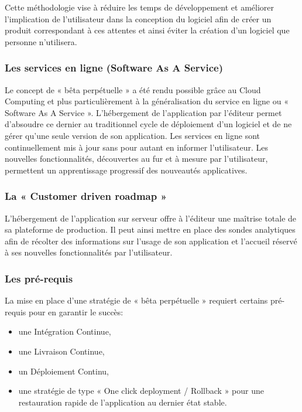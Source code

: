       Cette méthodologie vise à réduire les temps de développement et améliorer l’implication de l’utilisateur dans la conception du logiciel afin de créer un produit correspondant à ces attentes et ainsi éviter la création d’un logiciel que personne n’utilisera.

      \subsubsection{Les services en ligne (Software As A Service)}
      Le concept de « bêta perpétuelle » a été rendu possible grâce au Cloud Computing et plus particulièrement à la généralisation du service en ligne ou « Software As A Service ». L’hébergement de l’application par l’éditeur permet d’absoudre ce dernier au traditionnel cycle de déploiement d’un logiciel et de ne gérer qu’une seule version de son application. Les services en ligne sont continuellement mis à jour sans pour autant en informer l’utilisateur. Les nouvelles fonctionnalités, découvertes au fur et à mesure par l’utilisateur, permettent un apprentissage progressif des nouveautés applicatives.

      \subsubsection{La « Customer driven roadmap »}
      L’hébergement de l’application sur serveur offre à l’éditeur une maîtrise totale de sa plateforme de production. Il peut ainsi mettre en place des sondes analytiques afin de récolter des informations sur l’usage de son application et l’accueil réservé à ses nouvelles fonctionnalités par l’utilisateur.

      \subsubsection{Les pré-requis}
      La mise en place d’une stratégie de « bêta perpétuelle » requiert certains pré-requis pour en garantir le succès:\\
      \begin{itemize}
        \item une Intégration Continue,
        \item une Livraison Continue,
        \item un Déploiement Continu,
        \item une stratégie de type « One click deployment / Rollback » pour une restauration rapide de l’application au dernier état stable.\\
      \end{itemize}

